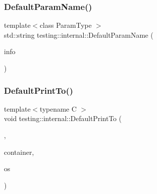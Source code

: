 \mbox{\label{namespacetesting_1_1internal_a954ec4a8a932dac7743e77e459ffefdc}} 
\subsubsection{\texorpdfstring{DefaultParamName()}{DefaultParamName()}}
{\footnotesize\ttfamily template$<$class Param\+Type $>$ \\
std\+::string testing\+::internal\+::\+Default\+Param\+Name (\begin{DoxyParamCaption}\item[{const \mbox{\hyperlink{structtesting_1_1TestParamInfo}{Test\+Param\+Info}}$<$ Param\+Type $>$ \&}]{info }\end{DoxyParamCaption})}

\mbox{\label{namespacetesting_1_1internal_a2e96c98d5bd8ee4a1b92f8e3cde7dd40}} 
\subsubsection{\texorpdfstring{DefaultPrintTo()}{DefaultPrintTo()}\hspace{0.1cm}{\footnotesize\ttfamily [1/4]}}
{\footnotesize\ttfamily template$<$typename C $>$ \\
void testing\+::internal\+::\+Default\+Print\+To (\begin{DoxyParamCaption}\item[{\mbox{\hyperlink{structtesting_1_1internal_1_1WrapPrinterType}{Wrap\+Printer\+Type}}$<$ \mbox{\hyperlink{namespacetesting_1_1internal_a17fb8f0125fa92404a249ed38a43faa4a945a19e59155ce1d335e8c3bcbdf61db}{k\+Print\+Container}} $>$}]{,  }\item[{const C \&}]{container,  }\item[{\+::std\+::ostream $\ast$}]{os }\end{DoxyParamCaption})}

\mbox{\label{namespacetesting_1_1internal_a074522dd8d77d61878a042b8d05cc64a}} 
